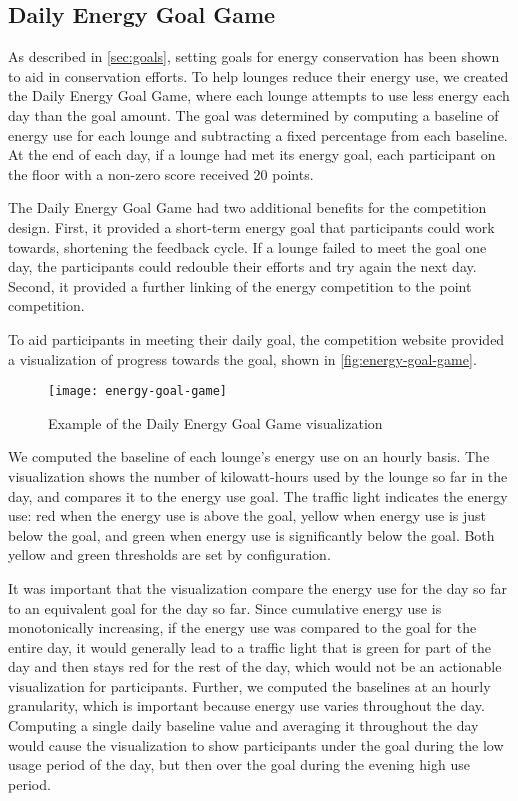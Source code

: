 \subsection{Daily Energy Goal Game}
\label{sec:energy-goal-game}

As described in \autoref{sec:goals}, setting goals for energy conservation has been shown to aid in conservation efforts. To help lounges reduce their energy use, we created the Daily Energy Goal Game, where each lounge attempts to use less energy each day than the goal amount. The goal was determined by computing a baseline of energy use for each lounge and subtracting a fixed percentage from each baseline. At the end of each day, if a lounge had met its energy goal, each participant on the floor with a non-zero score received 20 points.

The Daily Energy Goal Game had two additional benefits for the competition design. First, it provided a short-term energy goal that participants could work towards, shortening the feedback cycle. If a lounge failed to meet the goal one day, the participants could redouble their efforts and try again the next day. Second, it provided a further linking of the energy competition to the point competition.

To aid participants in meeting their daily goal, the competition website provided a visualization of progress towards the goal, shown in \autoref{fig:energy-goal-game}.

\begin{figure}[htbp]
	\centering
		\texttt{[image: energy-goal-game]}
		\caption{Example of the Daily Energy Goal Game visualization}
\label{fig:energy-goal-game}
\end{figure}

We computed the baseline of each lounge's energy use on an hourly basis. The visualization shows the number of kilowatt-hours used by the lounge so far in the day, and compares it to the energy use goal. The traffic light indicates the energy use: red when the energy use is above the goal, yellow when energy use is just below the goal, and green when energy use is significantly below the goal. Both yellow and green thresholds are set by configuration.

It was important that the visualization compare the energy use for the day so far to an equivalent goal for the day so far. Since cumulative energy use is monotonically increasing, if the energy use was compared to the goal for the entire day, it would generally lead to a traffic light that is green for part of the day and then stays red for the rest of the day, which would not be an actionable visualization for participants. Further, we computed the baselines at an hourly granularity, which is important because energy use varies throughout the day. Computing a single daily baseline value and averaging it throughout the day would cause the visualization to show participants under the goal during the low usage period of the day, but then over the goal during the evening high use period.


